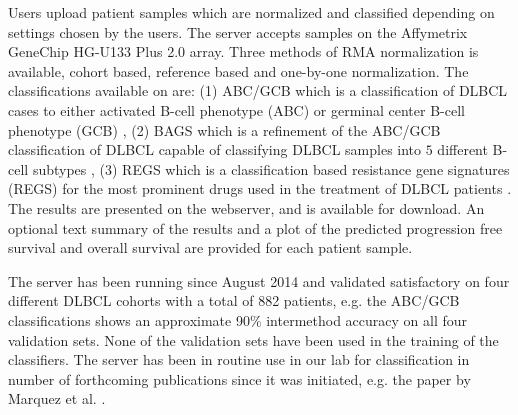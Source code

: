 Users upload patient samples which are normalized and classified depending on settings chosen by the users. The server accepts samples on the Affymetrix GeneChip HG-U133 Plus 2.0 array. Three  methods of RMA normalization is available, cohort based, reference based and one-by-one normalization. The classifications available on \hemaClass{} are:
(1) ABC/GCB which is a classification of DLBCL cases to either activated B-cell phenotype (ABC) or germinal center B-cell phenotype (GCB) \cite{Alizadeh2000},
(2) BAGS which is a refinement of the ABC/GCB classification of DLBCL capable of classifying DLBCL samples into $5$ different B-cell subtypes \cite{DybkaerBoegsted2015},
(3) REGS which is a classification based resistance gene signatures (REGS) for the most prominent drugs used in the treatment of DLBCL patients \cite{Falgreen2015}.
The results are presented on the webserver, and is available for download. An optional text summary of the results and a plot of the predicted progression free survival and overall survival are provided for each patient sample.

The server has been running since August 2014 and validated satisfactory on four different DLBCL cohorts with a total of 882 patients, e.g. the ABC/GCB classifications shows an approximate 90\% intermethod accuracy on all four validation sets. None of the validation sets have been used in the training of the classifiers. The server has been in routine use in our lab for classification in number of forthcoming publications since it was initiated, e.g. the paper by Marquez et al. \cite{Marquez2015}.

\begingroup
\renewcommand{\section}[2]{}%


\endgroup



